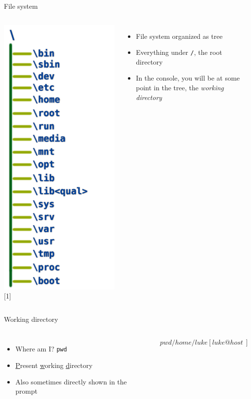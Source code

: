     \begin{frame}[t,fragile]{File system}
        \begin{columns}[T]
            \vspace{-0.6cm}
            \begin{center}
            \includegraphics[width=0.4\columnwidth]{img/fs.png}
            {\tiny [1]}
            \end{center}
            \begin{itemize}
                \item File system organized as tree
                \item Everything under \texttt{/}, the root directory
                \item In the console, you will be at some point in the tree,
                    the \emph{working directory}
            \end{itemize}
        \end{columns}
    \end{frame}

    \begin{frame}[t,fragile]{Working directory}
        \begin{columns}[T]
            \begin{itemize}
                \item Where am I? \textrightarrow \: \texttt{pwd}
                \item \underline{P}resent \underline{w}orking \underline{d}irectory
                \item Also sometimes directly shown in the prompt
            \end{itemize}
            \begin{bashenv}$ pwd
/home/luke
[luke@host ~]$
            \end{bashenv}
        \end{columns}
    \end{frame}

